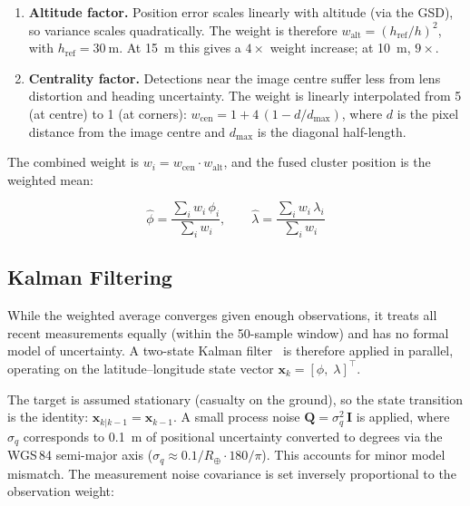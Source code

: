 \begin{enumerate}
  \item \textbf{Altitude factor.} Position error scales linearly with altitude (via the GSD), so variance scales quadratically. The weight is therefore $w_\mathrm{alt} = (h_\mathrm{ref} / h)^2$, with $h_\mathrm{ref} = \SI{30}{\metre}$. At \SI{15}{\metre} this gives a $4\times$ weight increase; at \SI{10}{\metre}, $9\times$.
  \item \textbf{Centrality factor.} Detections near the image centre suffer less from lens distortion and heading uncertainty. The weight is linearly interpolated from 5 (at centre) to 1 (at corners):
  $w_\mathrm{cen} = 1 + 4\,(1 - d / d_\mathrm{max})$, where $d$ is the pixel distance from the image centre and $d_\mathrm{max}$ is the diagonal half-length.
\end{enumerate}

\noindent The combined weight is $w_i = w_\mathrm{cen} \cdot w_\mathrm{alt}$, and the fused cluster position is the weighted mean:

\begin{equation}\label{eq:weighted-avg}
  \hat{\phi} = \frac{\sum_i w_i\,\phi_i}{\sum_i w_i}, \qquad
  \hat{\lambda} = \frac{\sum_i w_i\,\lambda_i}{\sum_i w_i}
\end{equation}

\subsection{Kalman Filtering}\label{sec:kalman}

While the weighted average converges given enough observations, it treats all recent measurements equally (within the 50-sample window) and has no formal model of uncertainty. A two-state Kalman filter~\cite{kalman1960} is therefore applied in parallel, operating on the latitude--longitude state vector $\mathbf{x}_k = [\phi,\;\lambda]^\top$.

The target is assumed stationary (casualty on the ground), so the state transition is the identity: $\mathbf{x}_{k|k-1} = \mathbf{x}_{k-1}$. A small process noise $\mathbf{Q} = \sigma_q^2\,\mathbf{I}$ is applied, where $\sigma_q$ corresponds to \SI{0.1}{\metre} of positional uncertainty converted to degrees via the WGS\,84 semi-major axis ($\sigma_q \approx 0.1 / R_\oplus \cdot 180/\pi$). This accounts for minor model mismatch. The measurement noise covariance is set inversely proportional to the observation weight:

